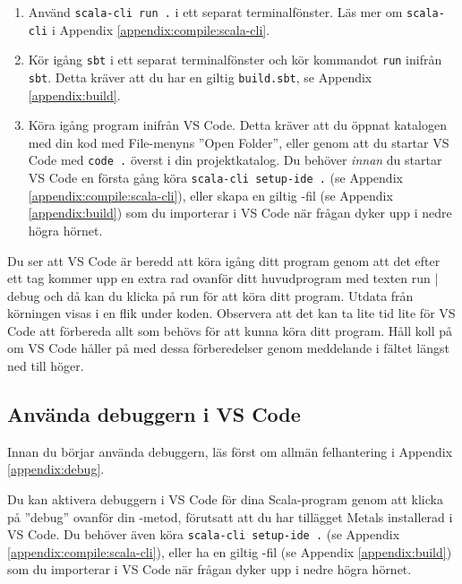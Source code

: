 \begin{enumerate}
  \item Använd \texttt{scala-cli run .} i ett separat terminalfönster. Läs mer om \texttt{scala-cli} i Appendix \ref{appendix:compile:scala-cli}.
  \item Kör igång \texttt{sbt} i ett separat terminalfönster och kör kommandot \texttt{run} inifrån \texttt{sbt}. Detta kräver att du har en giltig \texttt{build.sbt}, se Appendix \ref{appendix:build}.
  \item Köra igång program inifrån VS Code. Detta kräver att du öppnat katalogen med din kod med File-menyns ''Open Folder'', eller genom att du startar VS Code med \texttt{code .} överst i din projektkatalog. Du behöver \textit{innan} du startar VS Code en första gång köra \texttt{scala-cli setup-ide .} (se Appendix \ref{appendix:compile:scala-cli}), eller skapa en giltig -fil (se Appendix \ref{appendix:build}) som du importerar i VS Code när frågan dyker upp i nedre högra hörnet. 
\end{enumerate}

Du ser att VS Code är beredd att köra igång ditt program genom att det efter ett tag kommer upp en extra rad ovanför ditt huvudprogram med texten \textsf{run | debug} och då kan du klicka på \textsf{run} för att köra ditt program. Utdata från körningen visas i en flik under koden. Observera att det kan ta lite tid lite för VS Code att förbereda allt som behövs för att kunna köra ditt program. Håll koll på om VS Code håller på med dessa förberedelser genom meddelande i fältet längst ned till höger. 

\subsection{Använda debuggern i VS Code}

Innan du börjar använda debuggern, läs först om allmän felhantering i Appendix \ref{appendix:debug}.

Du kan aktivera debuggern i VS Code för dina Scala-program genom att klicka på ''debug'' ovanför din -metod, förutsatt att du har tillägget Metals installerad i VS Code. Du behöver även köra \texttt{scala-cli setup-ide .} (se Appendix \ref{appendix:compile:scala-cli}), eller ha en giltig -fil (se Appendix \ref{appendix:build}) som du importerar i VS Code när frågan dyker upp i nedre högra hörnet. 

